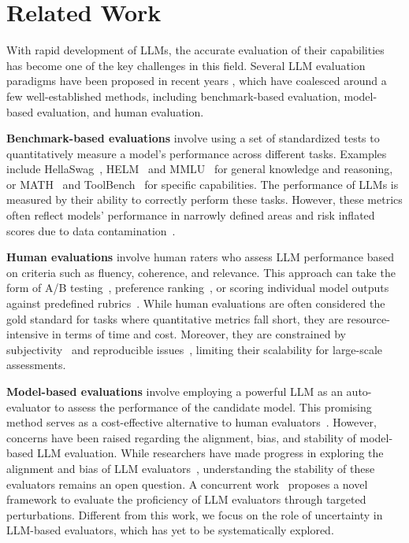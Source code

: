 \section{Related Work}
\vspace{-0.5em}

With rapid development of LLMs, the accurate evaluation of their capabilities has become one of the key challenges in this field. Several LLM evaluation paradigms have been proposed in recent years \citep{chang2024survey}, which have coalesced around a few well-established methods, including benchmark-based evaluation, model-based evaluation, and human evaluation.

\textbf{Benchmark-based evaluations} involve using a set of standardized tests to quantitatively measure a model’s performance across different tasks. Examples include HellaSwag~\citep{zellers2019hellaswag}, HELM~\citep{liang2022holistic} and MMLU~\citep{hendrycks2020measuring} for general knowledge and reasoning, or MATH~\citep{hendrycks2measuring} and ToolBench~\citep{xu2023tool} for specific capabilities. The performance of LLMs is measured by their ability to correctly perform these tasks. However, these metrics often reflect models' performance in narrowly defined areas and risk inflated scores due to data contamination~\citep{orenproving}.

\textbf{Human evaluations} involve human raters who assess LLM performance based on criteria such as fluency, coherence, and relevance. This approach can take the form of A/B testing~\citep{tang2010overlapping}, preference ranking~\citep{bai2022training}, or scoring individual model outputs against predefined rubrics~\citep{novikova2017we}. While human evaluations are often considered the gold standard for tasks where quantitative metrics fall short, they are resource-intensive in terms of time and cost. Moreover, they are constrained by subjectivity~\citep{krishna2023longeval} and reproducible issues~\citep{karpinska2021perils}, limiting their scalability for large-scale assessments.

\textbf{Model-based evaluations} involve employing a powerful LLM as an auto-evaluator to assess the performance of the candidate model. This promising method serves as a cost-effective alternative to human evaluators~\citep{zheng2023judging, wangpandalm, yu2024kieval, yu2024freeeval}. However, concerns have been raised regarding the alignment, bias, and stability of model-based LLM evaluation. While researchers have made progress in exploring the alignment and bias of LLM evaluators~\citep{liu2024calibrating,wang2023large}, understanding the stability of these evaluators remains an open question. A concurrent work~\citep{doddapaneni2024finding} proposes a novel framework to evaluate the proficiency of LLM evaluators through targeted perturbations. Different from this work, we focus on the role of uncertainty in LLM-based evaluators, which has yet to be systematically explored.

